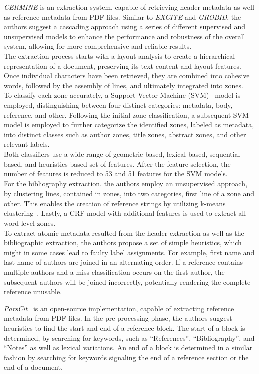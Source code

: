 \textit{CERMINE} is an extraction system, capable of retrieving header metadata as well as reference metadata from PDF files. Similar to \textit{EXCITE} and \textit{GROBID}, the authors suggest a cascading approach using a series of different supervised and unsupervised models to enhance the performance and robustness of the overall system, allowing for more comprehensive and reliable results.\\
The extraction process starts with a layout analysis to create a hierarchical representation of a document, preserving its text content and layout features. 
Once individual characters have been retrieved, they are combined into cohesive words, followed by the assembly of lines, and ultimately integrated into zones.\\
To classify each zone accurately, a Support Vector Machine (SVM)~\cite{hearst1998support} model is employed, distinguishing between four distinct categories: metadata, body, reference, and other. 
Following the initial zone classification, a subsequent SVM model is employed to further categorize the identified zones, labeled as metadata, into distinct classes such as author zones, title zones, abstract zones, and other relevant labels.\\
Both classifiers use a wide range of geometric-based, lexical-based, sequential-based, and heuristics-based set of features. After the feature selection, the number of features is reduced to 53 and 51 features for the SVM models.\\
For the bibliography extraction, the authors employ an unsupervised approach, by clustering lines, contained in zones, into two categories, first line of a zone and other. This enables the creation of reference strings by utilizing k-means clustering~\cite{hartigan1979algorithm}. Lastly, a CRF model with additional features is used to extract all word-level zones.\\
To extract atomic metadata resulted from the header extraction as well as the bibliographic extraction, the authors propose a set of simple heuristics, which might in some cases lead to faulty label assignments. For example, first name and last name of authors are joined in an alternating order. If a reference contains multiple authors and a miss-classification occurs on the first author, the subsequent authors will be joined incorrectly, potentially rendering the complete reference unusable.\par
\textit{ParsCit}~\cite{councill2008parscit} is an open-source implementation, capable of extracting reference metadata from PDF files. In the pre-processing phase, the authors suggest heuristics to find the start and end of a reference block. The start of a block is determined, by searching for keywords, such as \enquote{References}, \enquote{Bibliography}, and \enquote{Notes} as well as lexical variations. An end of a block is determined in a similar fashion by searching for keywords signaling the end of a reference section or the end of a document.\\
